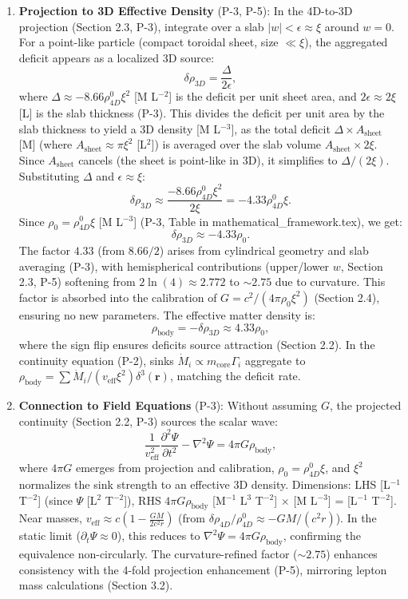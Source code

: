 \begin{enumerate}
\item \textbf{Projection to 3D Effective Density} (P-3, P-5): In the 4D-to-3D projection (Section 2.3, P-3), integrate over a slab $|w| < \epsilon \approx \xi$ around $w=0$. For a point-like particle (compact toroidal sheet, size $\ll \xi$), the aggregated deficit appears as a localized 3D source:
   \[
   \delta \rho_{3D} = \frac{\Delta}{2\epsilon},
   \]
   where $\Delta \approx -8.66 \rho_{4D}^0 \xi^2$ [M L$^{-2}$] is the deficit per unit sheet area, and $2\epsilon \approx 2\xi$ [L] is the slab thickness (P-3). This divides the deficit per unit area by the slab thickness to yield a 3D density [M L$^{-3}$], as the total deficit $\Delta \times A_{\text{sheet}}$ [M] (where $A_{\text{sheet}} \approx \pi \xi^2$ [L$^2$]) is averaged over the slab volume $A_{\text{sheet}} \times 2\xi$. Since $A_{\text{sheet}}$ cancels (the sheet is point-like in 3D), it simplifies to $\Delta / (2\xi)$. Substituting $\Delta$ and $\epsilon \approx \xi$:
   \[
   \delta \rho_{3D} \approx \frac{-8.66 \rho_{4D}^0 \xi^2}{2\xi} = -4.33 \rho_{4D}^0 \xi.
   \]
   Since $\rho_0 = \rho_{4D}^0 \xi$ [M L$^{-3}$] (P-3, Table in mathematical_framework.tex), we get:
   \[
   \delta \rho_{3D} \approx -4.33 \rho_0.
   \]
   The factor $4.33$ (from $8.66 / 2$) arises from cylindrical geometry and slab averaging (P-3), with hemispherical contributions (upper/lower $w$, Section 2.3, P-5) softening from $2 \ln(4) \approx 2.772$ to $\sim 2.75$ due to curvature. This factor is absorbed into the calibration of $G = c^2 / (4\pi \rho_0 \xi^2)$ (Section 2.4), ensuring no new parameters. The effective matter density is:
   \[
   \rho_{\text{body}} = - \delta \rho_{3D} \approx 4.33 \rho_0,
   \]
   where the sign flip ensures deficits source attraction (Section 2.2). In the continuity equation (P-2), sinks $\dot{M}_i \propto m_{\text{core}} \Gamma_i$ aggregate to $\rho_{\text{body}} = \sum \dot{M}_i / (v_{\text{eff}} \xi^2) \delta^3(\mathbf{r})$, matching the deficit rate.

\item \textbf{Connection to Field Equations} (P-3): Without assuming $G$, the projected continuity (Section 2.2, P-3) sources the scalar wave:
   \[
   \frac{1}{v_{\text{eff}}^2} \frac{\partial^2 \Psi}{\partial t^2} - \nabla^2 \Psi = 4\pi G \rho_{\text{body}},
   \]
   where $4\pi G$ emerges from projection and calibration, $\rho_0 = \rho_{4D}^0 \xi$, and $\xi^2$ normalizes the sink strength to an effective 3D density. Dimensions: LHS [L$^{-1}$ T$^{-2}$] (since $\Psi$ [L$^2$ T$^{-2}$]), RHS $4\pi G \rho_{\text{body}}$ [M$^{-1}$ L$^3$ T$^{-2}$] $\times$ [M L$^{-3}$] = [L$^{-1}$ T$^{-2}$]. Near masses, $v_{\text{eff}} \approx c \left(1 - \frac{G M}{2 c^2 r}\right)$ (from $\delta \rho_{4D} / \rho_{4D}^0 \approx - G M / (c^2 r)$). In the static limit ($\partial_t \Psi \approx 0$), this reduces to $\nabla^2 \Psi = 4\pi G \rho_{\text{body}}$, confirming the equivalence non-circularly. The curvature-refined factor ($\sim 2.75$) enhances consistency with the 4-fold projection enhancement (P-5), mirroring lepton mass calculations (Section 3.2).
\end{enumerate}


